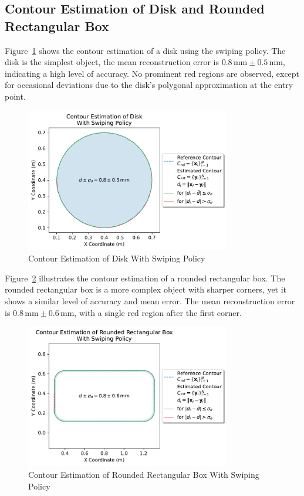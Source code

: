 \subsection{Contour Estimation of Disk and Rounded Rectangular Box}

Figure~\ref{fig:experiment-disk-swiping} shows the contour estimation of a disk using the swiping policy.
The disk is the simplest object, the mean reconstruction error is $0.8\,\text{mm} \pm 0.5\,\text{mm}$, indicating a high level of accuracy.
No prominent red regions are observed, except for occasional deviations due to the disk's polygonal approximation at the entry point.

\begin{figure}[!htb]
    \centering
    \includegraphics[width=0.8\textwidth]{figures/experiments/disk-swiping}
    \caption{Contour Estimation of Disk With Swiping Policy}
    \label{fig:experiment-disk-swiping}
\end{figure}

Figure~\ref{fig:experiment-rounded-rectangular-box-swiping} illustrates the contour estimation of a rounded rectangular box.
The rounded rectangular box is a more complex object with sharper corners, yet it shows a similar level of accuracy and mean error.
The mean reconstruction error is $0.8\,\text{mm} \pm 0.6\,\text{mm}$, with a single red region after the first corner.

\begin{figure}[!htb]
    \centering
    \includegraphics[width=0.8\textwidth]{figures/experiments/rounded-rectangular-box-swiping}
    \caption{Contour Estimation of Rounded Rectangular Box With Swiping Policy}
    \label{fig:experiment-rounded-rectangular-box-swiping}
\end{figure}

